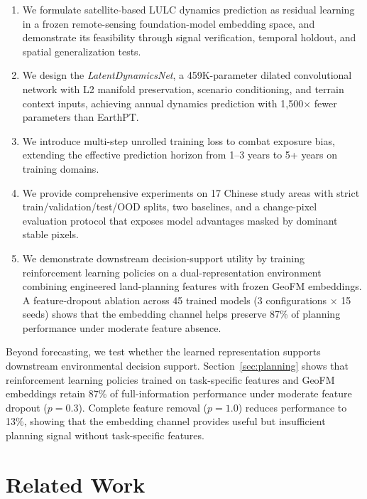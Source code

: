 \documentclass{article}
\begin{document}
\begin{enumerate}
\item We formulate satellite-based LULC dynamics prediction as residual learning in a frozen remote-sensing foundation-model embedding space, and demonstrate its feasibility through signal verification, temporal holdout, and spatial generalization tests.

\item We design the \textit{LatentDynamicsNet}, a 459K-parameter dilated convolutional network with L2 manifold preservation, scenario conditioning, and terrain context inputs, achieving annual dynamics prediction with 1{,}500$\times$ fewer parameters than EarthPT.

\item We introduce multi-step unrolled training loss to combat exposure bias, extending the effective prediction horizon from 1--3 years to 5+ years on training domains.

\item We provide comprehensive experiments on 17 Chinese study areas with strict train/validation/test/OOD splits, two baselines, and a change-pixel evaluation protocol that exposes model advantages masked by dominant stable pixels.

\item We demonstrate downstream decision-support utility by training reinforcement learning policies on a dual-representation environment combining engineered land-planning features with frozen GeoFM embeddings. A feature-dropout ablation across 45 trained models (3 configurations $\times$ 15 seeds) shows that the embedding channel helps preserve 87\% of planning performance under moderate feature absence.
\end{enumerate}

Beyond forecasting, we test whether the learned representation supports downstream environmental decision support. Section~\ref{sec:planning} shows that reinforcement learning policies trained on task-specific features and GeoFM embeddings retain 87\% of full-information performance under moderate feature dropout ($p=0.3$). Complete feature removal ($p=1.0$) reduces performance to 13\%, showing that the embedding channel provides useful but insufficient planning signal without task-specific features.


\section{Related Work}
\label{sec:related}
\end{document}
